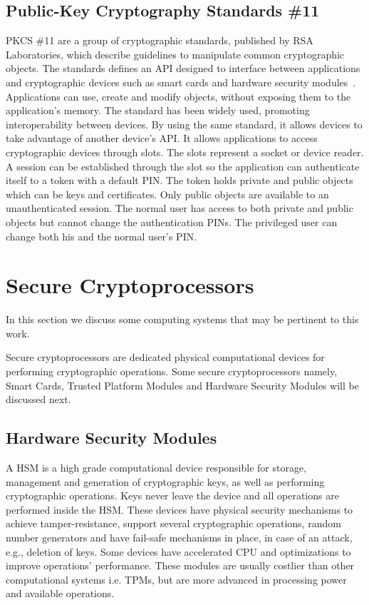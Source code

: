 \subsection{Public-Key Cryptography Standards \#11}
\ac{PKCS} \#11 are a group of cryptographic standards, published by RSA Laboratories, which describe guidelines to manipulate common cryptographic objects.
The standards defines an \ac{API} designed to interface between applications and cryptographic devices such as smart cards and hardware security modules~\cite{pkcs11analysis}. 
Applications can use, create and modify objects, without exposing them to the application's memory.
The standard has been widely used, promoting interoperability between devices. By using the same standard, it allows devices to take advantage of another device's \ac{API}.
It allows applications to access cryptographic devices through slots. The slots represent a socket or device reader. A session can be established through the slot so the application can authenticate itself to a token with a default \ac{PIN}. The token holds private and public objects which can be keys and certificates. Only public objects are available to an unauthenticated session. The normal user has access to both private and public objects but cannot change the authentication \ac{PIN}s. The privileged user can change both his and the normal user's \ac{PIN}.
\section{Secure Cryptoprocessors}\label{chap:background:cryptoprocessors}

In this section we discuss some computing systems that may be pertinent to this work. 

Secure cryptoprocessors are dedicated physical computational devices for performing cryptographic operations. Some secure cryptoprocessors namely, Smart Cards, Trusted Platform Modules and Hardware Security Modules will be discussed next.

\subsection{Hardware Security Modules}\label{chap:background:computing:hsm}

A \ac{HSM} is a high grade computational device responsible for storage, management and generation of cryptographic keys, as well as performing cryptographic operations. Keys never leave the device and all operations are performed inside the \ac{HSM}. These devices have physical security mechanisms to achieve tamper-resistance, support several cryptographic operations, random number generators and have fail-safe mechanisms in place, in case of an attack, e.g., deletion of keys. Some devices have accelerated \ac{CPU} and optimizations to improve operations' performance.
These modules are usually costlier than other computational systems i.e. \ac{TPM}s, but are more advanced in processing power and available operations.

